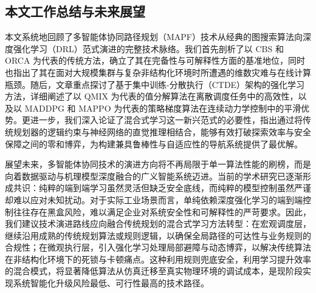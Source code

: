 \documentclass[13.5pt]{extarticle}
\begin{document}
\subsection{本文工作总结与未来展望}

本文系统地回顾了多智能体协同路径规划（MAPF）技术从经典的图搜索算法向深度强化学习（DRL）范式演进的完整技术脉络。我们首先剖析了以 CBS 和 ORCA 为代表的传统方法，确立了其在完备性与可解释性方面的基准地位，同时也指出了其在面对大规模集群与复杂非结构化环境时所遭遇的维数灾难与在线计算瓶颈。随后，文章重点探讨了基于集中训练-分散执行（CTDE）架构的强化学习方法，详细阐述了以 QMIX 为代表的值分解算法在离散调度任务中的高效性，以及以 MADDPG 和 MAPPO 为代表的策略梯度算法在连续动力学控制中的平滑优势。更进一步，我们深入论证了混合式学习这一新兴范式的必要性，指出通过将传统规划器的逻辑约束与神经网络的直觉推理相结合，能够有效打破探索效率与安全保障之间的零和博弈，为构建兼具鲁棒性与自适应性的导航系统提供了最优解。

展望未来，多智能体协同技术的演进方向将不再局限于单一算法性能的刷榜，而是向着数据驱动与机理模型深度融合的广义智能系统迈进。当前的学术研究已逐渐形成共识：纯粹的端到端学习虽然灵活但缺乏安全底线，而纯粹的模型控制虽然严谨却难以应对未知扰动。对于实际工业场景而言，单纯依赖深度强化学习的端到端控制往往存在黑盒风险，难以满足企业对系统安全性和可解释性的严苛要求。因此，我们建议技术演进路线应向融合传统规划的混合式学习方法转型：在宏观调度层，继续沿用成熟的传统规划算法或规则逻辑，以确保全局路径的可达性与业务规则的合规性；在微观执行层，引入强化学习处理局部避障与动态博弈，以解决传统算法在非结构化环境下的死锁与卡顿痛点。这种利用规则兜底安全，利用学习提升效率的混合模式，将显著降低算法从仿真迁移至真实物理环境的调试成本，是现阶段实现系统智能化升级风险最低、可行性最高的技术路径。



        
        
\end{document}
